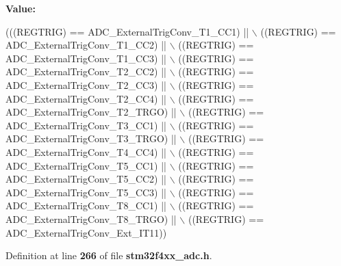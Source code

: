 {\bfseries Value\+:}
\begin{DoxyCode}
(((REGTRIG) == ADC_ExternalTrigConv_T1_CC1) || \(\backslash\)
                                  ((REGTRIG) == ADC_ExternalTrigConv_T1_CC2) || \(\backslash\)
                                  ((REGTRIG) == ADC_ExternalTrigConv_T1_CC3) || \(\backslash\)
                                  ((REGTRIG) == ADC_ExternalTrigConv_T2_CC2) || \(\backslash\)
                                  ((REGTRIG) == ADC_ExternalTrigConv_T2_CC3) || \(\backslash\)
                                  ((REGTRIG) == ADC_ExternalTrigConv_T2_CC4) || \(\backslash\)
                                  ((REGTRIG) == ADC_ExternalTrigConv_T2_TRGO) || \(\backslash\)
                                  ((REGTRIG) == ADC_ExternalTrigConv_T3_CC1) || \(\backslash\)
                                  ((REGTRIG) == ADC_ExternalTrigConv_T3_TRGO) || \(\backslash\)
                                  ((REGTRIG) == ADC_ExternalTrigConv_T4_CC4) || \(\backslash\)
                                  ((REGTRIG) == ADC_ExternalTrigConv_T5_CC1) || \(\backslash\)
                                  ((REGTRIG) == ADC_ExternalTrigConv_T5_CC2) || \(\backslash\)
                                  ((REGTRIG) == ADC_ExternalTrigConv_T5_CC3) || \(\backslash\)
                                  ((REGTRIG) == ADC_ExternalTrigConv_T8_CC1) || \(\backslash\)
                                  ((REGTRIG) == ADC_ExternalTrigConv_T8_TRGO) || \(\backslash\)
                                  ((REGTRIG) == ADC_ExternalTrigConv_Ext_IT11))
\end{DoxyCode}


Definition at line \textbf{ 266} of file \textbf{ stm32f4xx\+\_\+adc.\+h}.

